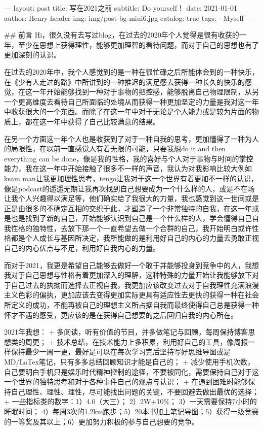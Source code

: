 ---
layout:     post
title:      写在2021之前
subtitle:   Do yourself！
date:       2021-01-01
author:     Henry
header-img: img/post-bg-miui6.jpg
catalog: true
tags:
    - Myself
---


## 前言
Hi，很久没有去写过blog，在过去的2020年个人觉得是很有收获的一年，至少在思想上获得理性，能够更加理智的看待问题，而对于自己的思想也有了更加深刻的认识。

在过去的2020年中，我个人感觉到的是一种在很忙碌之后所能体会到的一种快乐，在《少有人走过的路》中所讲到的一种推迟的满足感去获得一种长久的快乐的感觉，在这一年开始能够找到一种对于事物的把控感，能够脱离自己物理限制，从另一个更高维度去看待自己所面临的处境从而获得一种更加坚定的力量是我对这一年中收获很大的一个东西。而除了在这一年中对于无论是个人能力或是较为片面的物质上，都在这一年中获得了自己比较满意的结果。

在另一个方面这一年个人也是收获到了对于一种自我的思考，更加懂得了一种为人的局限性，在以前一直感觉人有着无限的可能，只要我想do it and then everything can be done，像是我的性格，我的喜好与个人对于事物与时间的掌控能力，我在这一年中开始接触了很多不一样的声音，我认为对我影响比较大例如ksam man让我更加理性思考，tengo让我对于这一个世界有着更加不一样的认识，像是podcast的遥遥无期让我再次找到自己想要成为一个什么样的人，或是不在场让我个人兴趣得以满足等，他们确实给了我很大的力量，我也感觉到这一世间或是正是由很多的不确定互相的交织于此，才塑造了一个非常独特的自我，在这一年或是也是找到了新的自己，开始能够认识到自己是一个什么样的人，学会懂得自己自我性格的独特性，去放下那一个一直希望去做一个合群的自己，我开始明白或许性格都是个人成长与基因所决定，我所能做的是利用好自己的内心的力量去勇敢正视自己的内心优点与不足，利用好自我内心的力量。

而对于2021，我更是希望自己能够去做好一个敢于并能够投身到竞争中的人，我想我对于自己思想与性格有着更加深入的理解，这种特殊的力量开始让我能够放下对于自己过去的执拗而选择去正视自我，我更加应该改变过去对于自我理性充满浪漫主义色彩的偏执，更加应该去变得更加实际更具有适应性去更快的获得一种在社会所定义的成功，不能再被自己的理想主义所占据自我而最终使得自己总是获得一种怀才不遇的感受，更应该的是在获得自己想要的之后回归自我的内心所在。

2021年我想：
+ 多阅读，听有价值的节目，并多做笔记与回顾，每周保持博客思想类的周更；
+ 技术总结，在技术能力上多积累，利用好自己的工具，像周报一样保持最少一周一更，最好是可以在每次学习完后坚持写好思维导图或是MD/LaTex笔记，只有多多总结回顾知识才能是自己的；
+ 减少使用手机次数，自己要明白手机只是娱乐时代精神控制的途径，不要被同化，需要保持自己对于这一个世界的独特思考和对于各种事件自己的观点与认识；
+ 在遇到困难时能够保持自己理性、理性、理性，尽可能找出问题的关键，不要回避去做出最优的选择；
+ 一些指标类的数字：1）4.0（大三）； 2）2W+10\%； 3）一天需要保持7小时的睡眠时间； 4）每周3次的1.2km跑步；5）20本书加上笔记导图；5）获得一级竞赛的一等奖及其以上；6）更加努力积极的参与自己想要的竞争。
